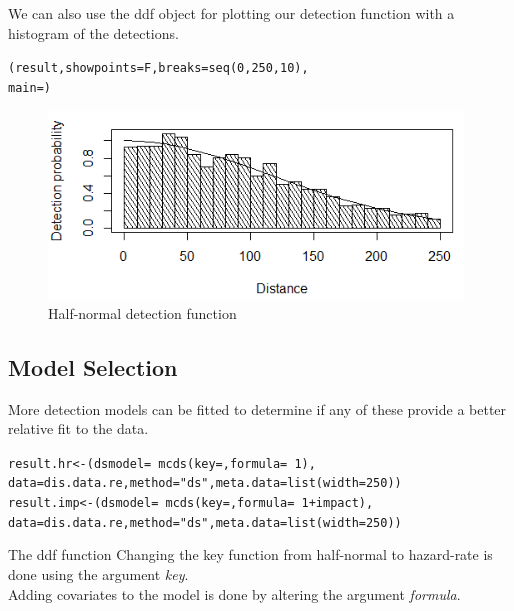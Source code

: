\noindent We can also use the ddf object for plotting our detection function with a histogram of the detections. 
\begin{knitrout}\footnotesize
{}\color{fgcolor}
\begin{kframe}
\begin{alltt}
(result,showpoints=F,breaks=seq(0,250,10),
     main=)
\end{alltt}
\end{kframe}
\end{knitrout}
\begin{figure}[h]
  \centering
  \includegraphics[width=11cm]{danish/HN_alldatacombined.png}
\caption{Half-normal detection function}
\label{fig:HN_all}
\end{figure}

\subsection{Model Selection}
\label{ss:modelselection}
More detection models can be fitted to determine if any of these provide a better relative fit to the data. 
\begin{knitrout}\footnotesize
{}\color{fgcolor}
\begin{kframe}
\begin{alltt}
result.hr <- (dsmodel=~mcds(key=, formula=~1), 
     data = dis.data.re, method="ds", meta.data=list(width=250))
result.imp <- (dsmodel=~mcds(key=, formula=~1+impact), 
     data = dis.data.re, method="ds", meta.data=list(width=250))
\end{alltt}
\end{kframe}
\end{knitrout}
\begin{block}{The ddf function}
Changing the key function from half-normal to hazard-rate is done using the argument \textit{key}.\\
Adding covariates to the model is done by altering the argument \textit{formula}.\\
\end{block}

